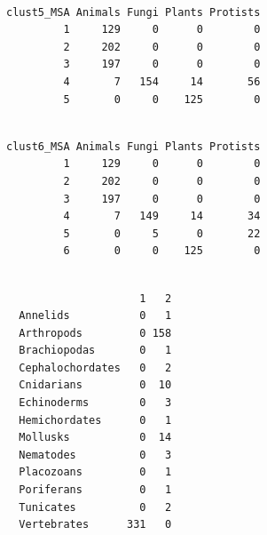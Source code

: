 \documentclass[
  letterpaper,
  DIV=11,
  numbers=noendperiod]{scrreprt}
\newenvironment{Shaded}{}{}
\newcommand{\DecValTok}[1]{\textcolor[rgb]{0.82,0.60,0.40}{#1}}
\newcommand{\FunctionTok}[1]{\textcolor[rgb]{0.38,0.69,0.94}{#1}}
\newcommand{\NormalTok}[1]{\textcolor[rgb]{0.67,0.70,0.75}{#1}}
\newcommand{\OtherTok}[1]{\textcolor[rgb]{0.15,0.68,0.38}{#1}}
\newcommand{\SpecialCharTok}[1]{\textcolor[rgb]{0.34,0.71,0.76}{#1}}
\newcommand{\StringTok}[1]{\textcolor[rgb]{0.60,0.76,0.47}{#1}}
\begin{document}
\begin{verbatim}
          
clust5_MSA Animals Fungi Plants Protists
         1     129     0      0        0
         2     202     0      0        0
         3     197     0      0        0
         4       7   154     14       56
         5       0     0    125        0
\end{verbatim}

\begin{Shaded}
\end{Shaded}

\begin{verbatim}
          
clust6_MSA Animals Fungi Plants Protists
         1     129     0      0        0
         2     202     0      0        0
         3     197     0      0        0
         4       7   149     14       34
         5       0     5      0       22
         6       0     0    125        0
\end{verbatim}

\begin{Shaded}
\end{Shaded}

\begin{verbatim}
                  
                     1   2
  Annelids           0   1
  Arthropods         0 158
  Brachiopodas       0   1
  Cephalochordates   0   2
  Cnidarians         0  10
  Echinoderms        0   3
  Hemichordates      0   1
  Mollusks           0  14
  Nematodes          0   3
  Placozoans         0   1
  Poriferans         0   1
  Tunicates          0   2
  Vertebrates      331   0
\end{verbatim}
\end{document}
